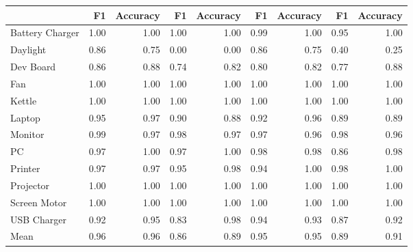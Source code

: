 \begin{tabular}{lrrrrrrrr}
\toprule
{} &    F1 &  Accuracy &    F1 &  Accuracy &    F1 &  Accuracy &    F1 &  Accuracy \\
\midrule
Battery Charger &  1.00 &      1.00 &  1.00 &      1.00 &  0.99 &      1.00 &  0.95 &      1.00 \\
Daylight        &  0.86 &      0.75 &  0.00 &      0.00 &  0.86 &      0.75 &  0.40 &      0.25 \\
Dev Board       &  0.86 &      0.88 &  0.74 &      0.82 &  0.80 &      0.82 &  0.77 &      0.88 \\
Fan             &  1.00 &      1.00 &  1.00 &      1.00 &  1.00 &      1.00 &  1.00 &      1.00 \\
Kettle          &  1.00 &      1.00 &  1.00 &      1.00 &  1.00 &      1.00 &  1.00 &      1.00 \\
Laptop          &  0.95 &      0.97 &  0.90 &      0.88 &  0.92 &      0.96 &  0.89 &      0.89 \\
Monitor         &  0.99 &      0.97 &  0.98 &      0.97 &  0.97 &      0.96 &  0.98 &      0.96 \\
PC              &  0.97 &      1.00 &  0.97 &      1.00 &  0.98 &      0.98 &  0.86 &      0.98 \\
Printer         &  0.97 &      0.97 &  0.95 &      0.98 &  0.94 &      1.00 &  0.98 &      1.00 \\
Projector       &  1.00 &      1.00 &  1.00 &      1.00 &  1.00 &      1.00 &  1.00 &      1.00 \\
Screen Motor    &  1.00 &      1.00 &  1.00 &      1.00 &  1.00 &      1.00 &  1.00 &      1.00 \\
USB Charger     &  0.92 &      0.95 &  0.83 &      0.98 &  0.94 &      0.93 &  0.87 &      0.92 \\
Mean            &  0.96 &      0.96 &  0.86 &      0.89 &  0.95 &      0.95 &  0.89 &      0.91 \\
\bottomrule
\end{tabular}
